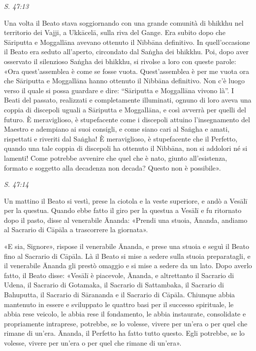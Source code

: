 \emph{S. 47:13}


Una volta il Beato stava soggiornando con una grande comunità di bhikkhu
nel territorio dei Vajji, a Ukkācelā, sulla riva del Gange. Era subito
dopo che Sāriputta e Moggallāna avevano ottenuto il Nibbāna definitivo.
In quell’occasione il Beato era seduto all’aperto, circondato dal Saṅgha
dei bhikkhu. Poi, dopo aver osservato il silenzioso Saṅgha dei bhikkhu,
si rivolse a loro con queste parole: «Ora quest’assemblea è come se
fosse vuota. Quest’assemblea è per me vuota ora che Sāriputta e
Moggallāna hanno ottenuto il Nibbāna definitivo. Non c’è luogo verso il
quale si possa guardare e dire: “Sāriputta e Moggallāna vivono là”. I
Beati del passato, realizzati e completamente illuminati, ognuno di loro
aveva una coppia di discepoli uguali a Sāriputta e Moggallāna, e così
avverrà per quelli del futuro. È meraviglioso, è stupefacente come i
discepoli attuino l’insegnamento del Maestro e adempiano ai suoi
consigli, e come siano cari al Saṅgha e amati, rispettati e riveriti dal
Saṅgha! È meraviglioso, è stupefacente che il Perfetto, quando una tale
coppia di discepoli ha ottenuto il Nibbāna, non si addolori né si
lamenti! Come potrebbe avvenire che quel che è nato, giunto
all’esistenza, formato e soggetto alla decadenza non decada? Questo non
è possibile».


\emph{S. 47:14}


Un mattino il Beato si vestì, prese la ciotola e la veste superiore, e
andò a Vesālī per la questua. Quando ebbe fatto il giro per la questua a
Vesālī e fu ritornato dopo il pasto, disse al venerabile Ānanda: «Prendi
una stuoia, Ānanda, andiamo al Sacrario di Cāpāla a trascorrere la
giornata».


«E sia, Signore», rispose il venerabile Ānanda, e prese una stuoia e
seguì il Beato fino al Sacrario di Cāpāla. Là il Beato si mise a sedere
sulla stuoia preparatagli, e il venerabile Ānanda gli prestò omaggio e
si mise a sedere da un lato. Dopo averlo fatto, il Beato disse: «Vesālī
è piacevole, Ānanda, e altrettanto il Sacrario di Udena, il Sacrario di
Gotamaka, il Sacrario di Sattambaka, il Sacrario di Bahuputta, il
Sacrario di Sārananda e il Sacrario di Cāpāla. Chiunque abbia mantenuto
in essere e sviluppato le quattro basi per il successo spirituale, le
abbia rese veicolo, le abbia rese il fondamento, le abbia instaurate,
consolidate e propriamente intraprese, potrebbe, se lo volesse, vivere
per un’era o per quel che rimane di un’era. Ānanda, il Perfetto ha fatto
tutto questo. Egli potrebbe, se lo volesse, vivere per un’era o per quel
che rimane di un’era».


